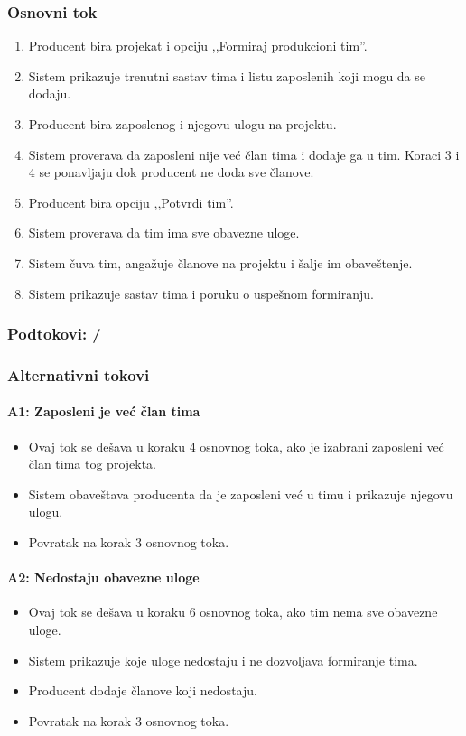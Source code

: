 \subsubsection*{Osnovni tok}
\begin{enumerate}
    \item Producent bira projekat i opciju ,,Formiraj produkcioni tim''.
    \item Sistem prikazuje trenutni sastav tima i listu zaposlenih koji mogu da se dodaju.
    \item Producent bira zaposlenog i njegovu ulogu na projektu.
    \item Sistem proverava da zaposleni nije već član tima i dodaje ga u tim. Koraci 3 i 4 se ponavljaju dok producent ne doda sve članove.
    \item Producent bira opciju ,,Potvrdi tim''.
    \item Sistem proverava da tim ima sve obavezne uloge.
    \item Sistem čuva tim, angažuje članove na projektu i šalje im obaveštenje.
    \item Sistem prikazuje sastav tima i poruku o uspešnom formiranju.
\end{enumerate}

\subsubsection*{Podtokovi: /}

\subsubsection*{Alternativni tokovi}

\paragraph*{A1: Zaposleni je već član tima}
\begin{itemize}
    \item Ovaj tok se dešava u koraku 4 osnovnog toka, ako je izabrani zaposleni već član tima tog projekta.
    \item Sistem obaveštava producenta da je zaposleni već u timu i prikazuje njegovu ulogu.
    \item Povratak na korak 3 osnovnog toka.
\end{itemize}

\paragraph*{A2: Nedostaju obavezne uloge}
\begin{itemize}
    \item Ovaj tok se dešava u koraku 6 osnovnog toka, ako tim nema sve obavezne uloge.
    \item Sistem prikazuje koje uloge nedostaju i ne dozvoljava formiranje tima.
    \item Producent dodaje članove koji nedostaju.
    \item Povratak na korak 3 osnovnog toka.
\end{itemize}

